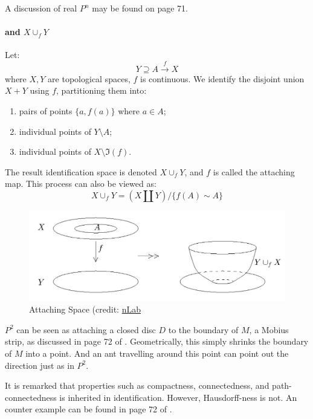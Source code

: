 \documentclass{article}
\begin{document}
\begin{defi}
    A discussion of real $P^n$ may be found on page 71.
\end{defi}

\paragraph{ and $X\cup_f Y$} Let:
\begin{equation}
    Y \supseteq A \overset{f}{\to} X
\end{equation}
where $X,Y$ are topological spaces, $f$ is continuous. We identify the
disjoint union $X+Y$ using $f$, partitioning them into:
\begin{enumerate}
    \item pairs of points $\{a,f(a)\}$ where $a\in A$;
    \item individual points of $Y\setminus A$;
    \item individual points of $X\setminus \Im(f)$.
\end{enumerate}
The result identification space is denoted $X\cup_f Y$, and $f$ is
called the attaching map. This process can also be viewed as:
\begin{equation}
    X\cup_f Y = (X\amalg Y)/\{f(A)\sim A\}
\end{equation}
\begin{figure}[H]
    \centering
    \includegraphics[width=0.6\linewidth]{pics/Attaching-Space.jpg}
    \caption{Attaching Space (credit:
        \href{https://ncatlab.org/nlab/show/Top}{nLab}}
\end{figure}
\begin{ex}
    $P^2$ can be seen as attaching a closed disc $D$ to the boundary
    of $M$, a Mobius strip, as discussed in page 72 of \cite{book}.
    Geometrically, this simply shrinks the boundary of $M$ into a
    point. And an ant travelling around this point can point out the
    direction just as in $P^2$.
\end{ex}
\begin{remark}
    It is remarked that properties such as compactness, connectedness,
    and path-connectedness is inherited in identification. However,
    Hausdorff-ness is not. An counter example can be found in page 72 of
    \cite{book}.
\end{remark}
\end{document}
